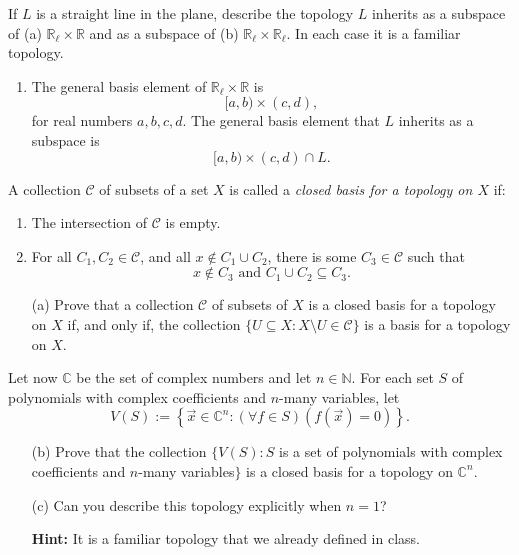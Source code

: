 \documentclass[../main.tex]{subfiles}
\begin{document}
\begin{problem}
    If $L$ is a straight line in the plane, describe the topology $L$ inherits as a subspace of (a) $\mathbb{R}_\ell \times \mathbb{R}$ and as a subspace of (b) $\mathbb{R}_\ell \times \mathbb{R}_\ell$.
    In each case it is a familiar topology.
\end{problem}
\begin{enumerate}[label=(\alph*)]
    \item The general basis element of $\mathbb{R}_\ell \times \mathbb{R}$ is
        \[
            [a, b) \times (c, d),
        \]
        for real numbers $a, b, c, d$.
        The general basis element that $L$ inherits as a subspace is
        \[[a, b) \times (c, d) \cap L.\]
\end{enumerate}

\begin{problem}
    A collection $\mathscr{C}$ of subsets of a set $X$ is called a \emph{closed basis for a topology on $X$} if:
    \begin{enumerate}[label=(\roman*)]
        \item The intersection of $\mathscr{C}$ is empty.
        \item For all $C_1, C_2 \in \mathscr{C}$, and all $x \notin C_1 \cup C_2$, there is some $C_3 \in \mathscr{C}$ such that
            \[
                x \notin C_3 \text{ and } C_1 \cup C_2 \subseteq C_3.
            \]
    \end{enumerate}

    \begin{enumerate}
        \item[(a)] Prove that a collection $\mathscr{C}$ of subsets of $X$ is a closed basis for a topology on $X$ if, and only if, the collection $\{U\subseteq X:X\setminus U\in\mathscr{C}\}$ is a basis for a topology on $X$.
    \end{enumerate} 

    Let now $\mathbb{C}$ be the set of complex numbers and let $n\in\mathbb{N}$. For each set $S$ of polynomials with complex coefficients and $n$-many variables, let
    \[
        V(S):=\left\{\vec x\in\mathbb{C}^n:(\forall f\in S)(f\left(\vec x\right)=0)\right\}.
    \]
    \begin{enumerate}
        \item[(b)] Prove that the collection
            $\{V(S): S$ is a set of polynomials with complex coefficients and $n$-many variables$\}$
            is a closed basis for a topology on $\mathbb{C}^n$.
        \item[(c)] Can you describe this topology explicitly when $n=1$?

        \textbf{Hint:} It is a familiar topology that we already defined in class.
    \end{enumerate}
\end{problem}
\end{document}
